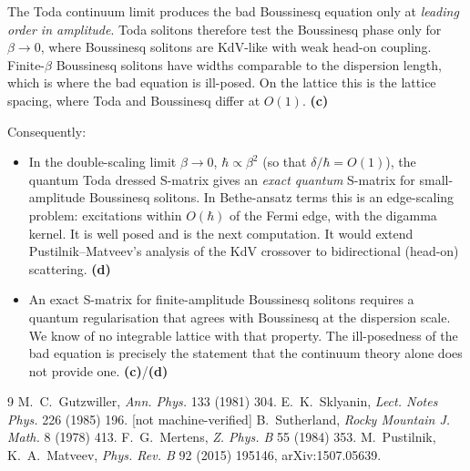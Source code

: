 \documentclass[11pt,a4paper]{article}
\newcommand{\Lc}{\textsf{\textbf{(c)}}}\newcommand{\Ld}{\textsf{\textbf{(d)}}}
\begin{document}
The Toda continuum limit produces the bad Boussinesq equation only at \emph{leading order in amplitude}. Toda solitons therefore test the Boussinesq phase only for $\beta\to0$, where Boussinesq solitons are KdV-like with weak head-on coupling. Finite-$\beta$ Boussinesq solitons have widths comparable to the dispersion length, which is where the bad equation is ill-posed. On the lattice this is the lattice spacing, where Toda and Boussinesq differ at $O(1)$. \Lc

Consequently:
\begin{itemize}
\item In the double-scaling limit $\beta\to0$, $\hbar\propto\beta^2$ (so that $\delta/\hbar=O(1)$), the quantum Toda dressed S-matrix gives an \emph{exact quantum} S-matrix for small-amplitude Boussinesq solitons. In Bethe-ansatz terms this is an edge-scaling problem: excitations within $O(\hbar)$ of the Fermi edge, with the digamma kernel. It is well posed and is the next computation. It would extend Pustilnik--Matveev's analysis of the KdV crossover \cite{PM} to bidirectional (head-on) scattering. \Ld
\item An exact S-matrix for finite-amplitude Boussinesq solitons requires a quantum regularisation that agrees with Boussinesq at the dispersion scale. We know of no integrable lattice with that property. The ill-posedness of the bad equation is precisely the statement that the continuum theory alone does not provide one. \Lc/\Ld
\end{itemize}

\begin{thebibliography}{9}\small
{} M.~C.~Gutzwiller, \emph{Ann. Phys.} 133 (1981) 304.
 E.~K.~Sklyanin, \emph{Lect. Notes Phys.} 226 (1985) 196. [not machine-verified]
 B.~Sutherland, \emph{Rocky Mountain J. Math.} 8 (1978) 413.
 F.~G.~Mertens, \emph{Z. Phys. B} 55 (1984) 353.
 M.~Pustilnik, K.~A.~Matveev, \emph{Phys. Rev. B} 92 (2015) 195146, arXiv:1507.05639.
\end{thebibliography}
\end{document}
